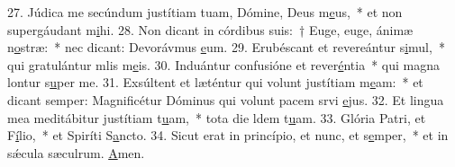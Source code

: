 27. Júdica me secúndum justítiam tuam, Dómine, Deus m\uline{e}us,~* et non supergáudant m\uline{i}hi.
28. Non dicant in córdibus suis:~† Euge, euge, ánimæ n\uline{o}stræ:~* nec dicant: Devorávmus \uline{e}um.
29. Erubéscant et revereántur s\uline{i}mul,~* qui gratulántur mlis m\uline{e}is.
30. Induántur confusióne et rever\uline{é}ntia~* qui magna lontur s\uline{u}per me.
31. Exsúltent et læténtur qui volunt justítiam m\uline{e}am:~* et dicant semper: Magnificétur Dóminus qui volunt pacem srvi \uline{e}jus.
32. Et lingua mea meditábitur justítiam t\uline{u}am,~* tota die ldem t\uline{u}am.
33. Glória Patri, et F\uline{í}lio,~* et Spiríti S\uline{a}ncto.
34. Sicut erat in princípio, et nunc, et s\uline{e}mper,~* et in sǽcula sæculrum. \uline{A}men.
